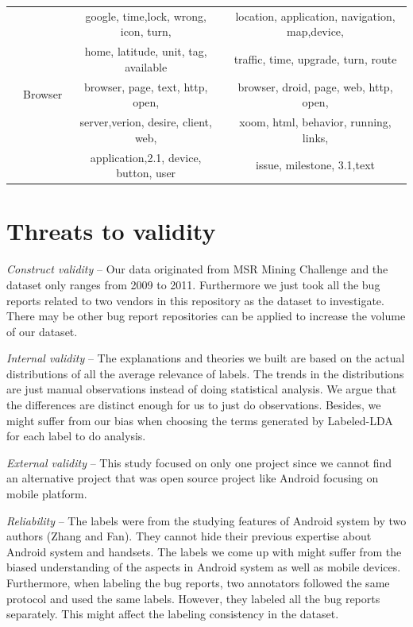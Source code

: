 \documentclass[10pt, conference, compsocconf]{IEEEtran}
\begin{document}
\begin{table}[!htb]
\begin{tabular}{|c||c||c||c|}
&&google, time,lock, wrong, icon, turn, & location, application, navigation, map,device, \\

&&home, latitude, unit, tag, available & traffic, time, upgrade, turn, route\\ \cline{2-4}

    &Browser& browser, page, text, http, open, & browser, droid, page, web, http, open, \\
    &&server,verion, desire, client, web, & xoom, html, behavior, running, links, \\
&& application,2.1, device, button, user  & issue, milestone, 3.1,text \\
\hline
\end{tabular}
\end{table}

\section{Threats to validity}

\textit{Construct validity} – Our data originated from MSR Mining Challenge \cite{MSRChallenge2012} and the dataset only ranges from 2009 to 2011. Furthermore we just took all the bug reports related to two vendors in this repository as the dataset to investigate. There may be other bug report repositories can be applied to increase the volume of our dataset. 

\textit{Internal validity} – The explanations and theories we built are based on the actual distributions of all the  average relevance of labels. The trends in the distributions are just manual observations instead of doing statistical analysis. We argue that the differences are distinct enough for us to just do observations. Besides, we might suffer from our bias when choosing the terms generated by Labeled-LDA for each label to do analysis. 

\textit{External validity} – This study focused on only one project since we cannot find an alternative project that was open source project like Android focusing on mobile platform.

\textit{Reliability} – The labels were from the studying features of Android system by two authors (Zhang and Fan). They cannot hide their previous expertise about Android system and handsets. The labels we come up with might suffer from the biased understanding of the aspects in Android system as well as mobile devices. Furthermore, when labeling the bug reports, two annotators followed the same protocol and used the same labels. However, they labeled all the bug reports separately. This might affect the labeling consistency in the dataset. 
\end{document}
